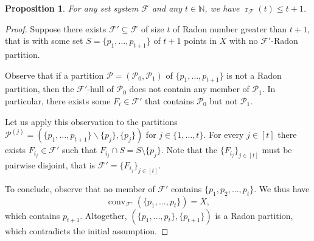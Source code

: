 \documentclass[a4paper,UKenglish,thm-restate]{article}
\newcommand{\N}{\mathbb{N}}
\newcommand{\F}{\mathcal{F}}
\DeclareMathOperator{\conv}{conv}
\DeclareMathOperator{\rad}{r}
\newtheorem{proposition}[lemma]{Proposition}
\begin{document}
\begin{proposition}
 For any set system $\F$ and any $t \in \N$, we have $\rad_{\mathcal{F}}(t)\leq t+1$.
\end{proposition}
\begin{proof}
  Suppose there exists $\mathcal{F}' \subseteq \F$ of size $t$ of Radon number greater than $t+1$, that is with some set $S=\{p_1,\dots,p_{t+1}\}$ of $t+1$ points in $X$ with no $\F'$-Radon partition.

  \medskip

  Observe that if a partition $\mathcal{P}=(\mathcal{P}_0,\mathcal{P}_1)$ of $\{p_1,\dots,p_{t+1}\}$ is not a Radon partition, then the $\F'$-hull of $\mathcal{P}_0$ does not contain any member of $\mathcal{P}_1$. In particular, there exists some $F_i\in\F'$ that contains $\mathcal{P}_0$ but not $\mathcal{P}_1$.

  \medskip

  Let us apply this observation to the partitions $\mathcal{P}^{(j)}=(\{p_1,\dots,p_{t+1}\}\backslash \{p_j\},\{p_j\})$ for $j\in\{1,\dots,t\}$. For every $j \in [t]$ there exists $F_{i_j}\in\mathcal{F}'$ such that $F_{i_j} \cap S = S \setminus \{p_j\}$. Note that the $\{F_{i_j}\}_{j \in [t]}$ must be pairwise disjoint, that is $\F' = \{F_{i_j}\}_{j \in [t]}$.

  \medskip

  To conclude, observe that no member of $\F'$ contains $\{p_1,p_2, \ldots, p_t\}$. We thus have
  \[ \conv_{\mathcal{F}'}(\{p_1,\dots,p_t\})=X,\]
  which contains $p_{t+1}$. Altogether, $(\{p_1,\dots,p_t\},\{p_{t+1}\})$ is a Radon partition, which contradicts the initial assumption.
\end{proof}
\end{document}
